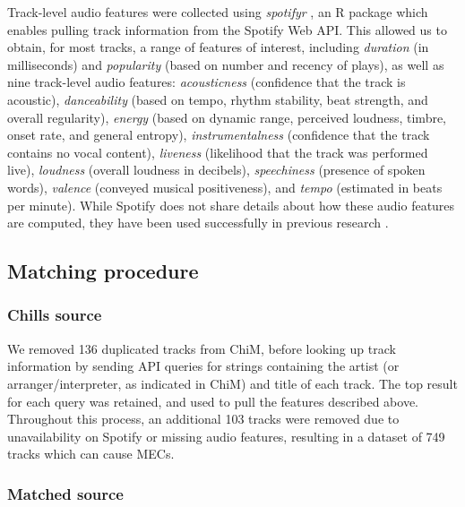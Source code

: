 Track-level audio features were collected using \emph{spotifyr} \parencite{thompson2020}, an R package which enables pulling track information from the Spotify Web API. This allowed us to obtain, for most tracks, a range of features of interest, including \emph{duration} (in milliseconds) and \emph{popularity} (based on number and recency of plays), as well as nine track-level audio features: \emph{acousticness} (confidence that the track is acoustic), \emph{danceability} (based on tempo, rhythm stability, beat strength, and overall regularity), \emph{energy} (based on dynamic range, perceived loudness, timbre, onset rate, and general entropy), \emph{instrumentalness} (confidence that the track contains no vocal content), \emph{liveness} (likelihood that the track was performed live), \emph{loudness} (overall loudness in decibels), \emph{speechiness} (presence of spoken words), \emph{valence} (conveyed musical positiveness), and \emph{tempo} (estimated in beats per minute). While Spotify does not share details about how these audio features are computed, they have been used successfully in previous research \parencite[e.g.,][]{masherrero2018, melchiorre2020}.

\subsection{Matching procedure}
\label{se:val-matching}

\subsubsection{Chills source}

We removed 136 duplicated tracks from ChiM, before looking up track information by sending API queries for strings containing the artist (or arranger/interpreter, as indicated in ChiM) and title of each track. The top result for each query was retained, and used to pull the features described above. Throughout this process, an additional 103 tracks were removed due to unavailability on Spotify or missing audio features, resulting in a dataset of 749 tracks which can cause MECs.

\subsubsection{Matched source}
\label{se:val-matching-2}

